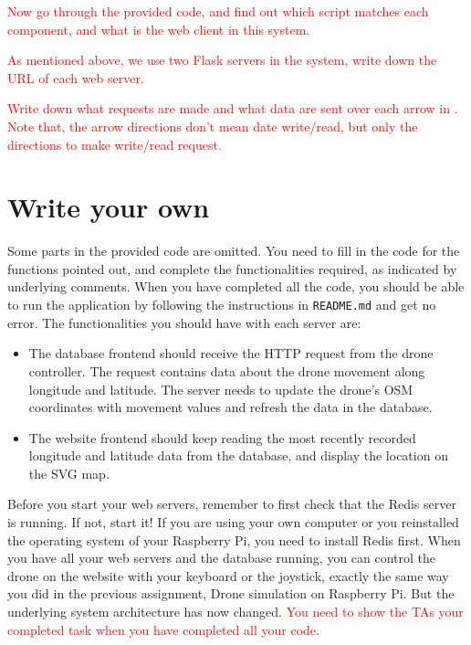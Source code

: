 \documentclass{article}
\begin{document}
\parbox[t]{13cm}{\textcolor{red}{Now go through the provided code, and find out which script matches each component, and what is the web client in this system.}}\vspace{0.5cm}

\parbox[t]{13cm}{\textcolor{red}{As mentioned above, we use two Flask servers in the system, write down the URL of each web server.}}\vspace{0.5cm}

\parbox[t]{13cm}{\textcolor{red}{Write down what requests are made and what data are sent over each arrow in . Note that, the arrow directions don't mean date write/read, but only the directions to make write/read request.}}\vspace{0.5cm}

\section{Write your own}

Some parts in the provided code are omitted. You need to fill in the code for the functions pointed out, and complete the functionalities required, as indicated by underlying comments. When you have completed all the code, you should be able to run the application by following the instructions in \verb!README.md! and get no error. The functionalities you should have with each server are:
\begin{itemize}
    \item The database frontend should receive the HTTP request from the drone controller. The request contains data about the drone movement along longitude and latitude. The server needs to update the drone's OSM coordinates with movement values and refresh the data in the database.
    \item The website frontend should keep reading the most recently recorded longitude and latitude data from the database, and display the location on the SVG map.
\end{itemize}

Before you start your web servers, remember to first check that the Redis server is running. If not, start it! If you are using your own computer or you reinstalled the operating system of your Raspberry Pi, you need to install Redis first. When you have all your web servers and the database running, you can control the drone on the website with your keyboard or the joystick, exactly the same way you did in the previous assignment, Drone simulation on Raspberry Pi. But the underlying system architecture has now changed. {\textcolor{red}{You need to show the TAs your completed task when you have completed all your code}}.
\newpage
\end{document}
